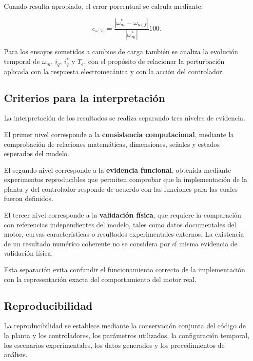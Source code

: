 Cuando resulta apropiado, el error porcentual se calcula mediante:

\begin{equation}
e_{\omega,\%}
=
\frac{
|\omega_m^*-\omega_{m,f}|
}{
|\omega_m^*|
}
100.
\end{equation}

Para los ensayos sometidos a cambios de carga también se analiza la evolución temporal de \(\omega_m\), \(i_q\), \(i_q^*\) y \(T_e\), con el propósito de relacionar la perturbación aplicada con la respuesta electromecánica y con la acción del controlador.

\subsection{Criterios para la interpretación}

La interpretación de los resultados se realiza separando tres niveles de evidencia.

El primer nivel corresponde a la \textbf{consistencia computacional}, mediante la comprobación de relaciones matemáticas, dimensiones, señales y estados esperados del modelo.

El segundo nivel corresponde a la \textbf{evidencia funcional}, obtenida mediante experimentos reproducibles que permiten comprobar que la implementación de la planta y del controlador responde de acuerdo con las funciones para las cuales fueron definidos.

El tercer nivel corresponde a la \textbf{validación física}, que requiere la comparación con referencias independientes del modelo, tales como datos documentales del motor, curvas características o resultados experimentales externos. La existencia de un resultado numérico coherente no se considera por sí misma evidencia de validación física.

Esta separación evita confundir el funcionamiento correcto de la implementación con la representación exacta del comportamiento del motor real.

\subsection{Reproducibilidad}

La reproducibilidad se establece mediante la conservación conjunta del código de la planta y los controladores, los parámetros utilizados, la configuración temporal, los escenarios experimentales, los datos generados y los procedimientos de análisis.

